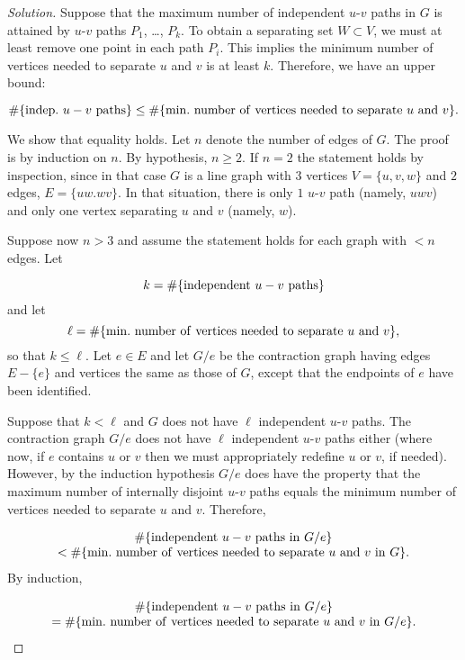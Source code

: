 \begin{proof}[Solution]
Suppose that the maximum number of independent $u$-$v$ paths in
$G$ is attained by $u$-$v$ paths $P_1$, \dots, $P_k$.
To obtain a separating set $W\subset V$, we must at least remove
one point in each path $P_i$. This implies
the minimum number of vertices needed to separate $u$ and $v$
is at least $k$. Therefore, we have an upper bound:

\[
\#\{ {\rm indep.}\ u-v\ {\rm paths}\}
\leq
\# \{{\rm min.\ number \ of\ vertices\ needed\ to\ separate}\ u\
{\rm and}\  v\}.
\]

We show that equality holds. Let $n$ denote the number
of edges of $G$. The proof is by induction on $n$. By hypothesis,
$n\geq 2$.
If $n=2$ the statement holds by inspection, since in that case
$G$ is a line graph with $3$ vertices
$V=\{u,v,w\}$ and $2$ edges, $E=\{uw.wv\}$. In that situation,
there is only $1$ $u$-$v$ path
(namely, $uwv$) and only one vertex separating $u$ and $v$
(namely, $w$).

Suppose now $n>3$ and assume the statement holds for each
graph with $<n$ edges. Let

\[
k = \#\{ {\rm independent}\ u-v\ {\rm paths}\}
\]
and let
\[
\ell =
\# \{{\rm min.\ number \ of\ vertices\ needed\ to\ separate}\
u\ {\rm and}\  v\},
\]
so that $k\leq \ell$. Let $e\in E$ and let $G/e$ be the
contraction graph having edges $E-\{e\}$ and
vertices the same as those of $G$, except that
the endpoints of $e$ have been identified.

Suppose that $k<\ell$ and $G$ does not have $\ell$
independent $u$-$v$ paths. The contraction
graph $G/e$ does not have $\ell$
independent $u$-$v$ paths either (where
now, if $e$ contains $u$ or $v$ then we must
appropriately redefine $u$ or $v$, if needed).
However, by the induction hypothesis
$G/e$ does have the property that
the maximum number of internally disjoint $u$-$v$ paths
equals the minimum number of vertices needed to separate $u$ and $v$.
Therefore,

\[
\begin{array}{c}
\#\{ {\rm independent}\ u-v\ {\rm paths\ in}\ G/e\}\\
<
\# \{{\rm min.\ number \ of\ vertices\ needed\ to\ separate}
\ u\ {\rm and}\  v\ {\rm in}\ G\}.
\end{array}
\]
By induction,

\[
\begin{array}{c}
\#\{ {\rm independent\ }u-v{\rm \ paths\ in\ }G/e\}\\
=
\# \{{\rm min.\ number \ of\ vertices\ needed\ to\ separate\
}u{\rm \ and}\  v\ {\rm in\ }G/e\}.
\end{array}
\]


\end{proof}
